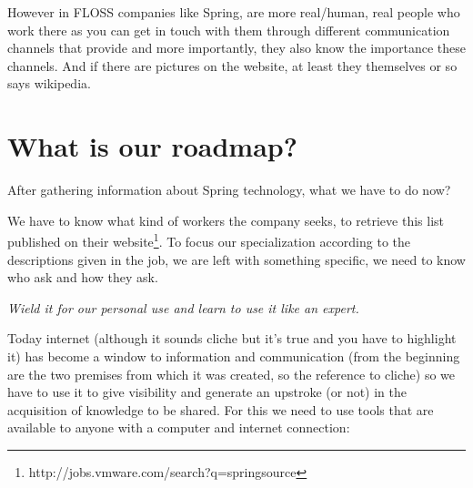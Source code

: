\documentclass[11pt]{scrartcl}
\begin{document}
\par However in FLOSS companies like Spring, are more real/human, real people who work there as you can get in touch with them through different communication channels that provide and more importantly, they also know the importance these channels. And if there are pictures on the website, at least they themselves or so says wikipedia.

\section{What is our roadmap?}

\par After gathering information about Spring technology, what we have to do now?

\par We have to know what kind of workers the company seeks, to retrieve this list published on their website\footnote{http://jobs.vmware.com/search?q=springsource}. To focus our specialization according to the descriptions given in the job, we are left with something specific, we need to know who ask and how they ask.

\par \emph{Wield it for our personal use and learn to use it like an expert.}

\par Today internet (although it sounds cliche but it's true and you have to highlight it) has become a window to information and communication (from the beginning are the two premises from which it was created, so the reference to cliche) so we have to use it to give visibility and generate an upstroke (or not) in the acquisition of knowledge to be shared. For this we need to use tools that are available to anyone with a computer and internet connection:
\end{document}
